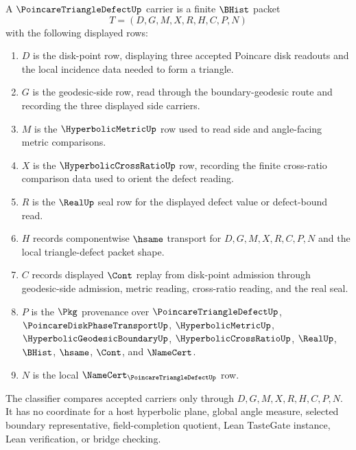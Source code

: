 \begin{definition}
\label{def:poincare-triangle-defect-carrier}
A $\PoincareTriangleDefectUp$ carrier is a finite $\BHist$ packet
$$
T=(D,G,M,X,R,H,C,P,N)
$$
with the following displayed rows:
\begin{enumerate}
\item $D$ is the disk-point row, displaying three accepted Poincare disk readouts and the local incidence data needed to form a triangle.
\item $G$ is the geodesic-side row, read through the boundary-geodesic route and recording the three displayed side carriers.
\item $M$ is the $\HyperbolicMetricUp$ row used to read side and angle-facing metric comparisons.
\item $X$ is the $\HyperbolicCrossRatioUp$ row, recording the finite cross-ratio comparison data used to orient the defect reading.
\item $R$ is the $\RealUp$ seal row for the displayed defect value or defect-bound read.
\item $H$ records componentwise $\hsame$ transport for $D,G,M,X,R,C,P,N$ and the local triangle-defect packet shape.
\item $C$ records displayed $\Cont$ replay from disk-point admission through geodesic-side admission, metric reading, cross-ratio reading, and the real seal.
\item $P$ is the $\Pkg$ provenance over $\PoincareTriangleDefectUp$, $\PoincareDiskPhaseTransportUp$, $\HyperbolicMetricUp$, $\HyperbolicGeodesicBoundaryUp$, $\HyperbolicCrossRatioUp$, $\RealUp$, $\BHist$, $\hsame$, $\Cont$, and $\NameCert$.
\item $N$ is the local $\NameCert_{\PoincareTriangleDefectUp}$ row.
\end{enumerate}
The classifier compares accepted carriers only through $D,G,M,X,R,H,C,P,N$. It has no coordinate for a host hyperbolic plane, global angle measure, selected boundary representative, field-completion quotient, Lean TasteGate instance, Lean verification, or bridge checking.
\end{definition}

